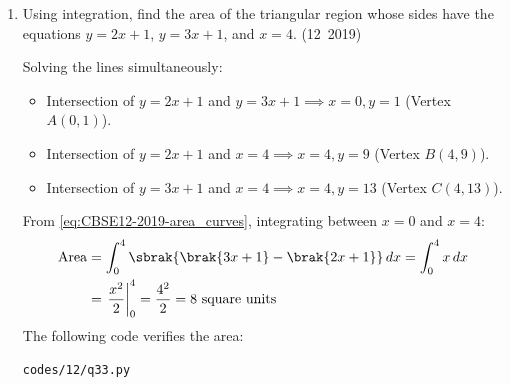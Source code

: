 \begin{enumerate}[label=\thesubsection.\arabic*, ref=\thesubsection.\theenumi]
\solution
From the Riemann sum definition \eqref{eq:CBSE12-2019-riemann_limit}:
\begin{align}
	\int_a^b f(x)\,dx = \lim_{h \to 0} h \sum_{r=1}^n f\brak{a + rh}
\end{align}
where $a = 1, b = 3 \implies nh = b - a = 2$, and $f(x) = x^2 + 2 + e^{2x}$.
Evaluating $f\brak{1 + rh}$:
\begin{align}
	f\brak{1 + rh} = \brak{1 + rh}^2 + 2 + e^{2\brak{1 + rh}} = 3 + 2rh + r^2h^2 + e^2\brak{e^{2h}}^r
\end{align}
Using standard summation formulas \eqref{eq:CBSE12-2019-sum_r}, \eqref{eq:CBSE12-2019-sum_r2}, and \eqref{eq:CBSE12-2019-sum_geom}:
\begin{align}
	h S_n &= 3\brak{nh} + 2h^2\left[\frac{n\brak{n+1}}{2}\right] + h^3\left[\frac{n\brak{n+1}\brak{2n+1}}{6}\right] + e^2 e^{2h} \left(\frac{e^{2nh} - 1}{e^{2h} - 1}\right) h \\
	&= 3\brak{nh} + \brak{nh}\brak{nh + h} + \frac{\brak{nh}\brak{nh + h}\brak{2nh + h}}{6} + e^2\brak{e^{2nh} - 1}e^{2h} \left(\frac{2h}{e^{2h} - 1}\right)\frac{1}{2}
\end{align}
Taking the limit as $h \to 0$ using \eqref{eq:CBSE12-2019-exp_limit}:
\begin{align}
	\int_1^3 \brak{x^2 + 2 + e^{2x}}\,dx &= 3\brak{2} + 2\brak{2} + \frac{2\brak{2}\brak{4}}{6} + \brak{e^6 - e^2}\brak{1}\left(\frac{1}{2}\cdot 1\right) \\
	&= 6 + 4 + \frac{8}{3} + \frac{e^6 - e^2}{2} = \frac{38}{3} + \frac{e^6 - e^2}{2}
\end{align}


\item Using integration, find the area of the triangular region whose sides have the equations $y = 2x + 1$, $y = 3x + 1$, and $x = 4$.
\hfill (12~2019)

\solution
Solving the lines simultaneously:
\begin{itemize}
	\item Intersection of $y = 2x + 1$ and $y = 3x + 1 \implies x = 0, y = 1$ (Vertex $A(0, 1)$).
	\item Intersection of $y = 2x + 1$ and $x = 4 \implies x = 4, y = 9$ (Vertex $B(4, 9)$).
	\item Intersection of $y = 3x + 1$ and $x = 4 \implies x = 4, y = 13$ (Vertex $C(4, 13)$).
\end{itemize}
From \eqref{eq:CBSE12-2019-area_curves}, integrating between $x = 0$ and $x = 4$:
\begin{align}
	\text{Area} &= \int_0^4 \sbrak{\brak{3x + 1} - \brak{2x + 1}}\,dx = \int_0^4 x\,dx \\
	&= \left.\frac{x^2}{2}\right|_0^4 = \frac{4^2}{2} = 8\text{ square units}
\end{align}
The following code verifies the area:
\begin{lstlisting}[frame=single, basicstyle=\ttfamily\small]
	codes/12/q33.py
\end{lstlisting}


\end{enumerate}
